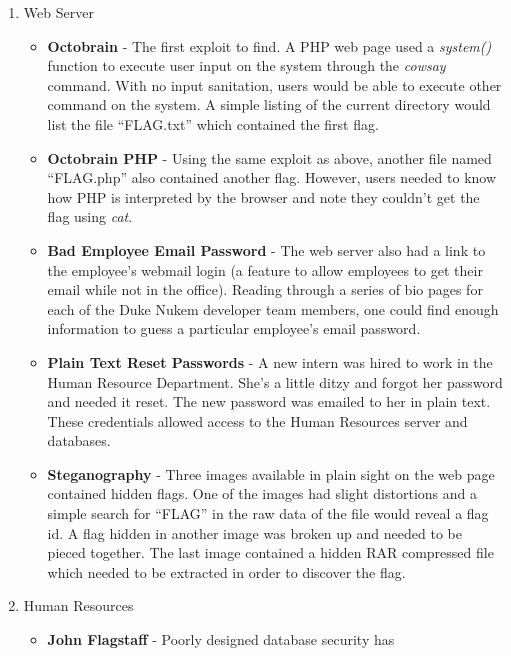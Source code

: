 \documentclass[10pt]{article}
\begin{document}
\begin{enumerate}
  \item Web Server
      \begin{itemize}
        \item \textbf{Octobrain} - The first exploit to find. A PHP web page
        used a \textit{system()} function to execute user input on the system
        through the \textit{cowsay} command. With no input sanitation, users
        would be able to execute other command on the system. A simple listing
        of the current directory would list the file ``FLAG.txt'' which
        contained the first flag.
        \item \textbf{Octobrain PHP} - Using the same exploit as above, another
        file named ``FLAG.php'' also contained another flag. However, users
        needed to know how PHP is interpreted by the browser and note they
        couldn't get the flag using \textit{cat}.
        \item \textbf{Bad Employee Email Password} - The web server also had a
        link to the employee's webmail login (a feature to allow employees to
        get their email while not in the office). Reading through a series of
        bio pages for each of the Duke Nukem developer team members, one could
        find enough information to guess a particular employee's email password.
        \item \textbf{Plain Text Reset Passwords} - A new intern was hired to
        work in the Human Resource Department. She's a little ditzy and forgot
        her password and needed it reset. The new password was emailed to her in
        plain text. These credentials allowed access to the Human Resources
        server and databases.
        \item \textbf{Steganography} - Three images available in plain sight on
        the web page contained hidden flags. One of the images had slight
        distortions and a simple search for ``FLAG'' in the raw data of the
        file would reveal a flag id. A flag hidden in another image was
        broken up and needed to be pieced together. The last image contained a
        hidden RAR compressed file which needed to be extracted in order to
        discover the flag.
      \end{itemize}
  \item Human Resources
      \begin{itemize}
        \item \textbf{John Flagstaff} - Poorly designed database security has

\end{itemize}
\end{enumerate}
\end{document}

